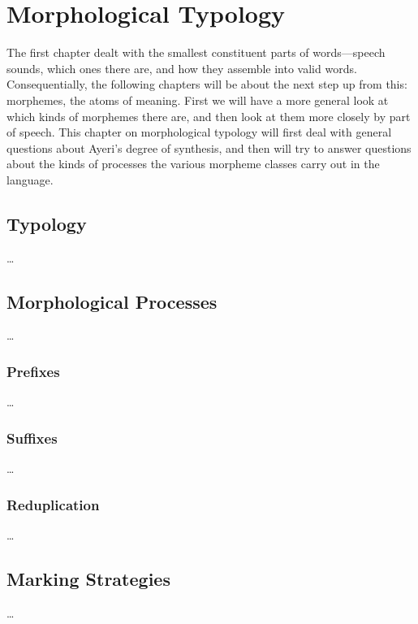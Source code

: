 
\chapter{Morphological Typology}

The first chapter dealt with the smallest constituent parts of words---speech 
sounds, which ones there are, and how they assemble into valid words. 
Consequentially, the following chapters will be about the next step up from 
this: morphemes, the atoms of meaning. First we will have a more general look 
at which kinds of morphemes there are, and then look at them more closely by 
part of speech. This chapter on morphological typology will first deal with 
general questions about Ayeri's degree of synthesis, and then will try 
to answer questions about the kinds of processes the various morpheme classes 
carry out in the language.

\section{Typology}

…

\section{Morphological Processes}

…

\subsection{Prefixes}

…

\subsection{Suffixes}

…

\subsection{Reduplication}

…

\section{Marking Strategies}

…

